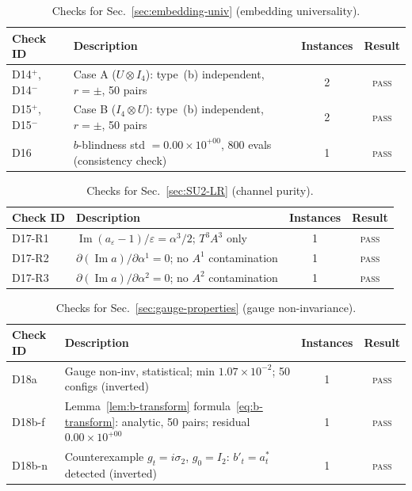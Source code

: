 \documentclass[12pt]{article}
\numberwithin{equation}{section}
\theoremstyle{plain}
\theoremstyle{definition}
\theoremstyle{remark}
\begin{document}
		\begin{table}[ht]
			\centering
			\caption{Checks for Sec.~\ref{sec:embedding-univ}
				(embedding universality).}
			\label{tab:checks-S5}
			\small
			\setlength{\tabcolsep}{6pt}
			\begin{tabular}{@{}lp{8cm}cc@{}}
				\toprule
				\textbf{Check ID} & \textbf{Description}
				& \textbf{Instances} & \textbf{Result}\\
				\midrule
				D14$^{+}$, D14$^{-}$
				& Case A ($U\otimes I_4$): type~(b) independent,
				$r = \pm$, 50 pairs
				& 2 & \textsc{pass}\\
				D15$^{+}$, D15$^{-}$
				& Case B ($I_4\otimes U$): type~(b) independent,
				$r = \pm$, 50 pairs
				& 2 & \textsc{pass}\\
				D16
				& $b$-blindness std $= 0.00\times 10^{+00}$,
				800 evals (consistency check)
				& 1 & \textsc{pass}\\
				\bottomrule
			\end{tabular}
		\end{table}
		
		\begin{table}[ht]
			\centering
			\caption{Checks for Sec.~\ref{sec:SU2-LR} (channel purity).}
			\label{tab:checks-S7}
			\small
			\setlength{\tabcolsep}{6pt}
			\begin{tabular}{@{}lp{8cm}cc@{}}
				\toprule
				\textbf{Check ID} & \textbf{Description}
				& \textbf{Instances} & \textbf{Result}\\
				\midrule
				D17-R1
				& $\operatorname{Im}(a_\varepsilon - 1)/\varepsilon
				= \alpha^{3}/2$; $T^{3} A^{3}$ only
				& 1 & \textsc{pass}\\
				D17-R2
				& $\partial(\operatorname{Im} a)/\partial \alpha^{1} = 0$;
				no $A^{1}$ contamination
				& 1 & \textsc{pass}\\
				D17-R3
				& $\partial(\operatorname{Im} a)/\partial \alpha^{2} = 0$;
				no $A^{2}$ contamination
				& 1 & \textsc{pass}\\
				\bottomrule
			\end{tabular}
		\end{table}
		
		\begin{table}[ht]
			\centering
			\caption{Checks for Sec.~\ref{sec:gauge-properties}
				(gauge non-invariance).}
			\label{tab:checks-S8}
			\small
			\setlength{\tabcolsep}{6pt}
			\begin{tabular}{@{}lp{8cm}cc@{}}
				\toprule
				\textbf{Check ID} & \textbf{Description}
				& \textbf{Instances} & \textbf{Result}\\
				\midrule
				D18a  & Gauge non-inv, statistical;
				min $1.07\times 10^{-2}$; 50 configs (inverted)
				& 1 & \textsc{pass}\\
				D18b-f
				& Lemma~\ref{lem:b-transform}
				formula~\eqref{eq:b-transform}: analytic, 50 pairs;
				residual $0.00\times 10^{+00}$
				& 1 & \textsc{pass}\\
				D18b-n
				& Counterexample $g_t = i\sigma_2$, $g_0 = I_2$:
				$b'_t = a^{*}_t$ detected (inverted)
				& 1 & \textsc{pass}\\
				\bottomrule
			\end{tabular}
		\end{table}
		
\end{document}
